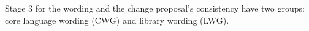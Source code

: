 
Stage 3 for the wording and the change proposal’s consistency have two groups: core language wording (CWG) and library wording (LWG).